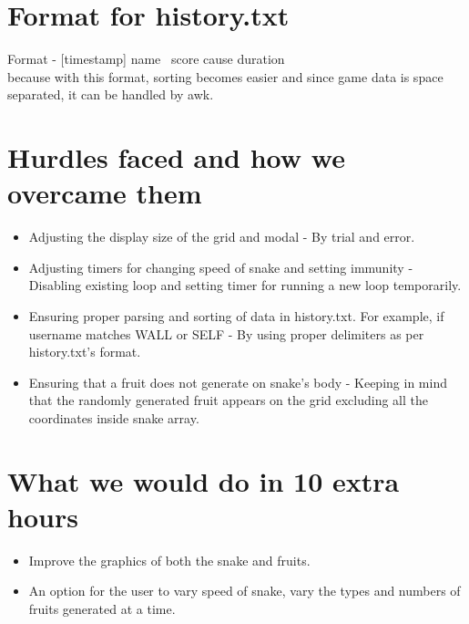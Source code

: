 \documentclass[12pt]{article}
\begin{document}
\section{Format for history.txt}

Format - [timestamp] name \textbar~score  cause  duration \\ because with this format, sorting becomes easier and since game data is space separated, it can be handled by awk.

\section{Hurdles faced and how we overcame them}

\begin{itemize}[leftmargin=1.5em]
    \item Adjusting the display size of the grid and modal - By trial and error.
    \item Adjusting timers for changing speed of snake and setting immunity - Disabling existing loop and setting timer for running a new loop temporarily.
    \item Ensuring proper parsing and sorting of data in history.txt. For example, if username matches WALL or SELF - By using proper delimiters as per history.txt's format.
    \item Ensuring that a fruit does not generate on snake's body - Keeping in mind that the randomly generated fruit appears on the grid excluding all the coordinates inside snake array.
\end{itemize}

\section{What we would do in 10 extra hours}

\begin{itemize}[leftmargin=1.5em]
    \item Improve the graphics of both the snake and fruits.
    \item An option for the user to vary speed of snake, vary the types and numbers of fruits generated at a time.
\end{itemize}



\end{document}
